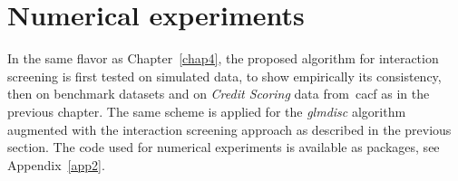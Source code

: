 %
%
%
%
%
%
%
%
%
%
%
%
%




\section{Numerical experiments}

In the same flavor as Chapter~\ref{chap4}, the proposed algorithm for interaction screening is first tested on simulated data, to show empirically its consistency, then on benchmark datasets and on \textit{Credit Scoring} data from~\gls{cacf} as in the previous chapter. The same scheme is applied for the \textit{glmdisc} algorithm augmented with the interaction screening approach as described in the previous section.
The code used for numerical experiments is available as packages, see Appendix~\ref{app2}.

